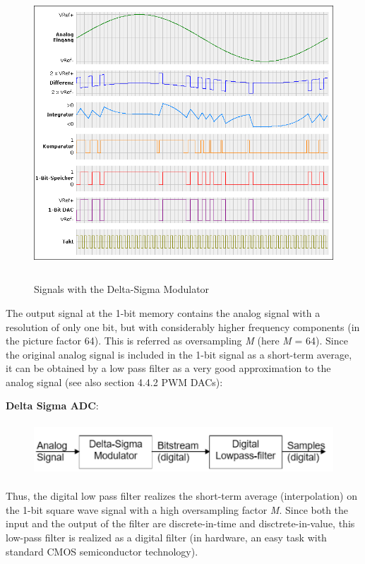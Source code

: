     \begin{figure}[h]
    \centering
    \includegraphics[width=15cm, height=11cm]{Images/image42.png}
    \caption{Signals with the Delta-Sigma Modulator}
    \label{fig:Fig }
    \end{figure}
    
The output signal at the 1-bit memory contains the analog signal with a resolution of only one bit, but with considerably higher frequency components (in the picture factor 64). This is referred as oversampling \textit{M} (here \textit{M} = 64). Since the original analog signal is included in the 1-bit signal as a short-term average, it can be obtained by a low pass filter as a very good approximation to the analog signal (see also section 4.4.2 PWM DACs):
\newpage

{\rot\bf Delta Sigma ADC}:

    \begin{figure}[h]
    \centering
    \includegraphics[width=12cm, height=2cm]{Images/image178.png}
    \caption{}
    \label{fig:Fig }
    \end{figure}
    
Thus, the digital low pass filter realizes the short-term average (interpolation) on the 1-bit square wave signal with a high oversampling factor \textit{M}. Since both the input and the output of the filter are discrete-in-time and disctrete-in-value, this low-pass filter is realized as a digital filter (in hardware, an easy task with standard CMOS semiconductor technology).

